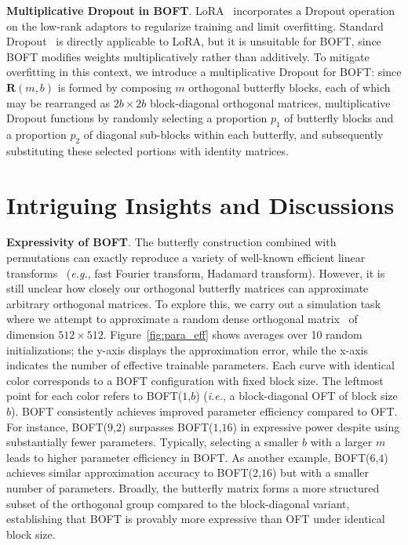 \textbf{Multiplicative Dropout in BOFT}. LoRA~\cite{hulora2022} incorporates a Dropout operation on the low-rank adaptors to regularize training and limit overfitting. Standard Dropout~\cite{srivastava2014dropout} is directly applicable to LoRA, but it is unsuitable for BOFT, since BOFT modifies weights multiplicatively rather than additively. To mitigate overfitting in this context, we introduce a multiplicative Dropout for BOFT: since $\bm{R}(m,b)$ is formed by composing $m$ orthogonal butterfly blocks, each of which may be rearranged as $2b\times 2b$ block-diagonal orthogonal matrices, multiplicative Dropout functions by randomly selecting a proportion $p_1$ of butterfly blocks and a proportion $p_2$ of diagonal sub-blocks within each butterfly, and subsequently substituting these selected portions with identity matrices.

\section{Intriguing Insights and Discussions}

\textbf{Expressivity of BOFT}. The butterfly construction combined with permutations can exactly reproduce a variety of well-known efficient linear transforms~\cite{dao2019learning,dao2019kaleidoscope} (\emph{e.g.}, fast Fourier transform, Hadamard transform). However, it is still unclear how closely our orthogonal butterfly matrices can approximate arbitrary orthogonal matrices. To explore this, we carry out a simulation task where we attempt to approximate a random dense orthogonal matrix~\cite{anderson1987generation} of dimension $512\times 512$. Figure~\ref{fig:para_eff} shows averages over 10 random initializations; the y-axis displays the approximation error, while the x-axis indicates the number of effective trainable parameters. Each curve with identical color corresponds to a BOFT configuration with fixed block size. The leftmost point for each color refers to BOFT($1$,$b$) (\emph{i.e.}, a block-diagonal OFT of block size $b$). BOFT consistently achieves improved parameter efficiency compared to OFT. For instance, BOFT($9$,$2$) surpasses BOFT($1$,$16$) in expressive power despite using substantially fewer parameters. Typically, selecting a smaller $b$ with a larger $m$ leads to higher parameter efficiency in BOFT. As another example, BOFT($6$,$4$) achieves similar approximation accuracy to BOFT($2$,$16$) but with a smaller number of parameters. Broadly, the butterfly matrix forms a more structured subset of the orthogonal group compared to the block-diagonal variant, establishing that BOFT is provably more expressive than OFT under identical block size.

